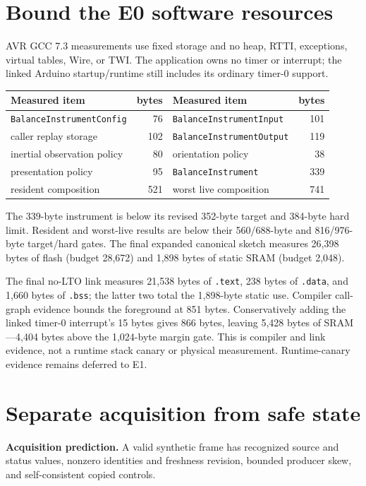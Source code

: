 \documentclass[11pt]{article}
\begin{document}
\section{Bound the E0 software resources}
AVR GCC 7.3 measurements use fixed storage and no heap, RTTI, exceptions,
virtual tables, Wire, or TWI. The application owns no timer or interrupt;
the linked Arduino startup/runtime still includes its ordinary timer-0
support.

\begin{tabularx}{\linewidth}{@{}X r X r@{}}
\toprule
Measured item & bytes & Measured item & bytes\\
\midrule
\texttt{BalanceInstrumentConfig} & 76 &
\texttt{BalanceInstrumentInput} & 101\\
caller replay storage & 102 &
\texttt{BalanceInstrumentOutput} & 119\\
inertial observation policy & 80 &
orientation policy & 38\\
presentation policy & 95 &
\texttt{BalanceInstrument} & 339\\
resident composition & 521 &
worst live composition & 741\\
\bottomrule
\end{tabularx}

The 339-byte instrument is below its revised 352-byte target and 384-byte hard
limit. Resident and worst-live results are below their 560/688-byte and
816/976-byte target/hard gates. The final expanded canonical sketch measures
26,398 bytes of flash (budget 28,672) and 1,898 bytes of static SRAM (budget
2,048).

The final no-LTO link measures 21,538 bytes of \texttt{.text}, 238 bytes of
\texttt{.data}, and 1,660 bytes of \texttt{.bss}; the latter two total the
1,898-byte static use. Compiler call-graph evidence bounds the foreground at
851 bytes. Conservatively adding the linked timer-0 interrupt's 15 bytes gives
866 bytes, leaving 5,428 bytes of SRAM---4,404 bytes above the 1,024-byte
margin gate. This is compiler and link evidence, not a runtime stack canary or
physical measurement. Runtime-canary evidence remains deferred to E1.

\section{Separate acquisition from safe state}
\textbf{Acquisition prediction.} A valid synthetic frame has recognized
source and status values, nonzero identities and freshness revision, bounded
producer skew, and self-consistent copied controls.
\end{document}
